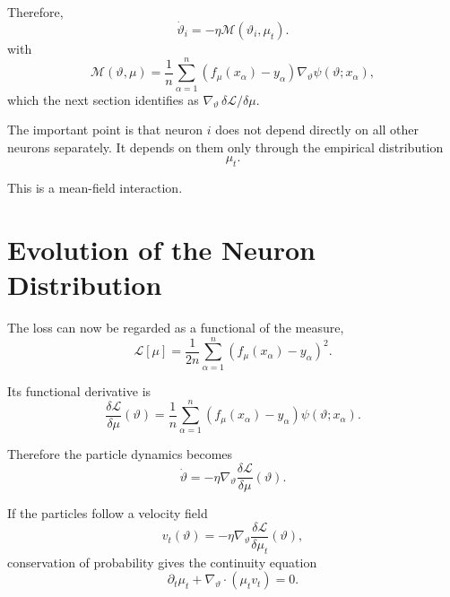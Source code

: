 Therefore,
\begin{equation}
    \boxed{
    \dot{\vartheta}_i
    =
    -
    \eta
    \mathcal{M}
    (\vartheta_i,\mu_t).
    }
\end{equation}
with
\begin{equation}
    \mathcal{M}(\vartheta,\mu)
    =
    \frac{1}{n}
    \sum_{\alpha=1}^{n}
    \left(
        f_\mu(x_\alpha)-y_\alpha
    \right)
    \nabla_\vartheta
    \psi(\vartheta;x_\alpha),
\end{equation}
which the next section identifies as
\(\nabla_\vartheta\,\delta\mathcal{L}/\delta\mu\).

The important point is that neuron \(i\) does not depend directly on
all other neurons separately. It depends on them only through the
empirical distribution
\[
\mu_t.
\]

This is a mean-field interaction.

\section{Evolution of the Neuron Distribution}

The loss can now be regarded as a functional of the measure,
\begin{equation}
    \mathcal{L}[\mu]
    =
    \frac{1}{2n}
    \sum_{\alpha=1}^{n}
    \left(
        f_\mu(x_\alpha)-y_\alpha
    \right)^2.
\end{equation}

Its functional derivative is
\begin{equation}
    \frac{\delta\mathcal{L}}{\delta\mu}
    (\vartheta)
    =
    \frac{1}{n}
    \sum_{\alpha=1}^{n}
    \left(
        f_\mu(x_\alpha)-y_\alpha
    \right)
    \psi(\vartheta;x_\alpha).
\end{equation}

Therefore the particle dynamics becomes
\begin{equation}
    \boxed{
    \dot{\vartheta}
    =
    -
    \eta
    \nabla_\vartheta
    \frac{\delta\mathcal{L}}
         {\delta\mu}(\vartheta).
    }
\end{equation}

If the particles follow a velocity field
\[
v_t(\vartheta)
=
-\eta
\nabla_\vartheta
\frac{\delta\mathcal{L}}
     {\delta\mu_t}(\vartheta),
\]
conservation of probability gives the continuity equation
\begin{equation}
    \partial_t\mu_t
    +
    \nabla_\vartheta\cdot
    \left(
        \mu_t v_t
    \right)
    =
    0.
\end{equation}

